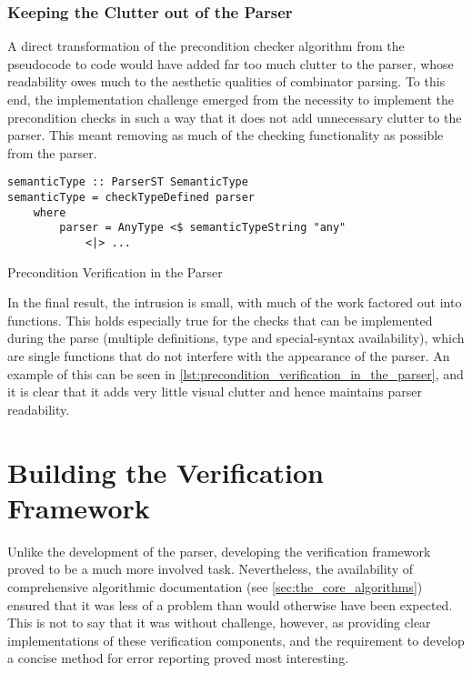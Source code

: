 
\subsubsection{Keeping the Clutter out of the Parser} %
\label{ssub:keeping_the_clutter_out_of_the_parser}
A direct transformation of the precondition checker algorithm from the pseudocode to code would have added far too much clutter to the parser, whose readability owes much to the aesthetic qualities of combinator parsing. 
To this end, the implementation challenge emerged from the necessity to implement the precondition checks in such a way that it does not add unnecessary clutter to the parser.
This meant removing as much of the checking functionality as possible from the parser. 

\begin{listing}[!htb]
\begin{verbatim}
semanticType :: ParserST SemanticType
semanticType = checkTypeDefined parser
    where
        parser = AnyType <$ semanticTypeString "any"
            <|> ...
\end{verbatim}
\caption{Precondition Verification in the Parser}
\label{lst:precondition_verification_in_the_parser}
\end{listing}

In the final result, the intrusion is small, with much of the work factored out into functions. 
This holds especially true for the checks that can be implemented during the parse (multiple definitions, type and special-syntax availability), which are single functions that do not interfere with the appearance of the parser.
An example of this can be seen in \autoref{lst:precondition_verification_in_the_parser}, and it is clear that it adds very little visual clutter and hence maintains parser readability.




\section{Building the Verification Framework} %
\label{sec:building_the_verification_framework}
Unlike the development of the parser, developing the verification framework proved to be a much more involved task. 
Nevertheless, the availability of comprehensive algorithmic documentation (see \autoref{sec:the_core_algorithms}) ensured that it was less of a problem than would otherwise have been expected.
This is not to say that it was without challenge, however, as providing clear implementations of these verification components, and the requirement to develop a concise method for error reporting proved most interesting.\\


